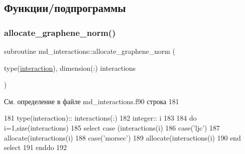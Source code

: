 \subsection{Функции/подпрограммы}
\mbox{\label{namespacemd__interactions_aba3551fb4bd5364e9cbcfbe81dd6aca9}} 
\subsubsection{\texorpdfstring{allocate\+\_\+graphene\+\_\+norm()}{allocate\_graphene\_norm()}}
{\footnotesize\ttfamily subroutine md\+\_\+interactions\+::allocate\+\_\+graphene\+\_\+norm (\begin{DoxyParamCaption}\item[{type(\mbox{\hyperlink{structmd__interactions_1_1interaction}{interaction}}), dimension(\+:)}]{interactions }\end{DoxyParamCaption})}



См. определение в файле md\+\_\+interactions.\+f90 строка 181


\begin{DoxyCode}
181     \textcolor{keywordtype}{type}(interaction):: interactions(:)
182     \textcolor{keywordtype}{integer}:: i
183     
184     \textcolor{keywordflow}{do} i=1,\textcolor{keyword}{size}(interactions)
185         \textcolor{keywordflow}{select case} (interactions(i)%
186         \textcolor{keywordflow}{case}(\textcolor{stringliteral}{'ljc'})
187             \textcolor{keyword}{allocate}(interactions(i)%
188         \textcolor{keywordflow}{case}(\textcolor{stringliteral}{'morsec'})
189             \textcolor{keyword}{allocate}(interactions(i)%
190 \textcolor{keywordflow}{        end select}
191 \textcolor{keywordflow}{    enddo}
192     
\end{DoxyCode}
\mbox{\label{namespacemd__interactions_a851acddc07bbaa6d08cf33c60a9e6822}} 
